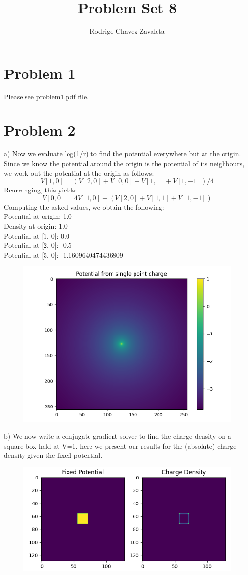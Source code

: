\documentclass[]{article}
\title{Problem Set 8}
\author{Rodrigo Chavez Zavaleta}
\begin{document}
\maketitle

\section{Problem 1}
Please see problem1.pdf file.

\section{Problem 2}

a) Now we evaluate log(1/r) to find the potential everywhere but at the origin. Since we know the potential around the origin is the potential of its neighbours, we work out the potential at the origin as follows:
$$
	V[1,0] = (V[2,0] + V[0,0] + V[1,1] + V[1,-1])/4
$$
Rearranging, this yields:
$$
	V[0,0] = 4V[1,0] - (V[2,0] + V[1,1] + V[1,-1])
$$
Computing the asked values, we obtain the following:
\\
Potential at origin: 1.0\\
Density at origin: 1.0\\
Potential at [1, 0]: 0.0\\
Potential at [2, 0]: -0.5\\
Potential at [5, 0]: -1.1609640474436809\\

\begin{figure}[h!]
	\centering
	\includegraphics[width=0.5\linewidth]{../Results/2a1.png}
\end{figure}

\newpage
b) We now write a conjugate gradient solver to find the charge density on a square box held at V=1. here we present our results for the (absolute) charge density given the fixed potential.

\begin{figure}[h!]
	\centering
	\includegraphics[width=0.75\linewidth]{../Results/2b1.png}
\end{figure}
\end{document}
